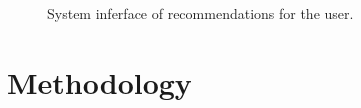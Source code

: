 \begin{figure}
\centering
{}
\caption{System inferface of recommendations for the user.}
\label{fig:recom}    
\end{figure}

\section{Methodology} 

